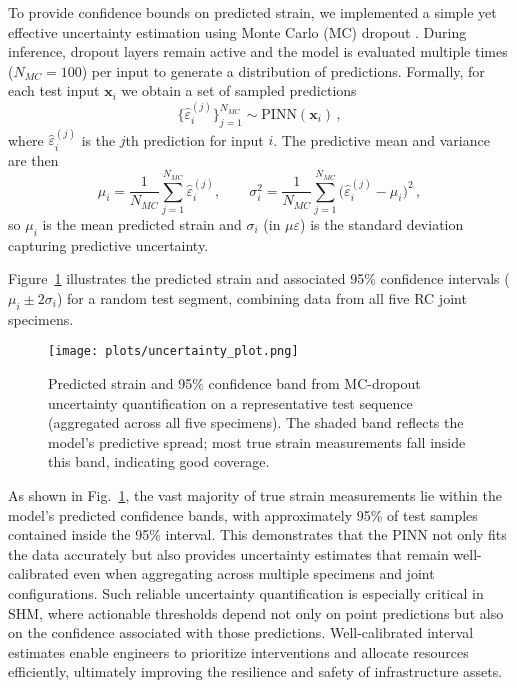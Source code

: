 \documentclass{article}
\begin{document}
To provide confidence bounds on predicted strain, we implemented a simple yet effective uncertainty estimation using Monte Carlo (MC) dropout \cite{gal2016dropout, ghosh2023fatigue}. During inference, dropout layers remain active and the model is evaluated multiple times ($N_{\!MC}=100$) per input to generate a distribution of predictions. Formally, for each test input $\mathbf{x}_i$ we obtain a set of sampled predictions 
\begin{equation}
\{\hat{\varepsilon}_i^{(j)}\}_{j=1}^{N_{\!MC}} \sim \text{PINN}(\mathbf{x}_i)\,,
\end{equation}
where $\hat{\varepsilon}_i^{(j)}$ is the $j$th prediction for input $i$. The predictive mean and variance are then 
\begin{equation}
\mu_i = \frac{1}{N_{\!MC}} \sum_{j=1}^{N_{\!MC}} \hat{\varepsilon}_i^{(j)}, \qquad
\sigma_i^2 = \frac{1}{N_{\!MC}} \sum_{j=1}^{N_{\!MC}} \Big(\hat{\varepsilon}_i^{(j)} - \mu_i\Big)^2\,,
\end{equation}
so $\mu_i$ is the mean predicted strain and $\sigma_i$ (in $\mu\varepsilon$) is the standard deviation capturing predictive uncertainty.

Figure~\ref{fig:uncertainty} illustrates the predicted strain and associated 95\% confidence intervals ($\mu_i \pm 2\sigma_i$) for a random test segment, combining data from all five RC joint specimens.

\begin{figure}[H]
    \centering
    \texttt{[image: plots/uncertainty\_plot.png]}
    \caption{Predicted strain and 95\% confidence band from MC-dropout uncertainty quantification on a representative test sequence (aggregated across all five specimens). The shaded band reflects the model’s predictive spread; most true strain measurements fall inside this band, indicating good coverage.}
    \label{fig:uncertainty}
\end{figure}

As shown in Fig.~\ref{fig:uncertainty}, the vast majority of true strain measurements lie within the model’s predicted confidence bands, with approximately 95\% of test samples contained inside the 95\% interval. This demonstrates that the PINN not only fits the data accurately but also provides uncertainty estimates that remain well-calibrated even when aggregating across multiple specimens and joint configurations. Such reliable uncertainty quantification is especially critical in SHM, where actionable thresholds depend not only on point predictions but also on the confidence associated with those predictions. Well-calibrated interval estimates enable engineers to prioritize interventions and allocate resources efficiently, ultimately improving the resilience and safety of infrastructure assets.
\end{document}
